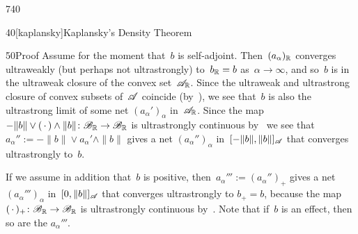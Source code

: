 \begin{parsec}{740}
\begin{point}{40}[kaplansky]{Kaplansky's Density Theorem}
\begin{point}{50}{Proof}
Assume for the moment that~$b$ is self-adjoint.
Then~$(a_\alpha)_{\mathbb{R}}$
converges ultraweakly (but perhaps not ultrastrongly)
to~$b_{\mathbb{R}}=b$
as~$\alpha\to\infty$,
and so~$b$ is in the ultraweak
closure of the convex set~$\mathscr{A}_{\mathbb{R}}$.
Since the ultraweak and ultrastrong closure
of convex subsets of~$\mathscr{A}$
coincide (by~),
we see that~$b$ is also the ultrastrong limit
of some net $(a_\alpha')_\alpha$ in~$\mathscr{A}_{\mathbb{R}}$.
Since the map~$-\|b\|\vee(\,\cdot\,)\wedge \|b\|\colon
\mathscr{B}_{\mathbb{R}}\to\mathscr{B}_{\mathbb{R}}$
is ultrastrongly continuous by~
we see that 
$a_\alpha'' := -\|b\|\vee a_\alpha'\wedge \|b\|$
gives a net $(a_\alpha'')_\alpha$
in~$[-\|b\|,\|b\|]_{\mathscr{A}}$
that
converges ultrastrongly
to~$b$.

If we assume in addition
that~$b$ is positive,
then~$a_\alpha''' := (a_\alpha'')_+$
gives a net~$(a_\alpha''')_\alpha$
in~$[0,\|b\|]_{\mathscr{A}}$
that converges ultrastrongly to $b_+=b$,
because the map $(\,\cdot\,)_+\colon \mathscr{B}_{\mathbb{R}}\to\mathscr{B}_{\mathbb{R}}$
is ultrastrongly continuous by~.
Note that if~$b$ is an effect,
then so are the $a_\alpha'''$.


\end{point}
\end{point}
\end{parsec}
